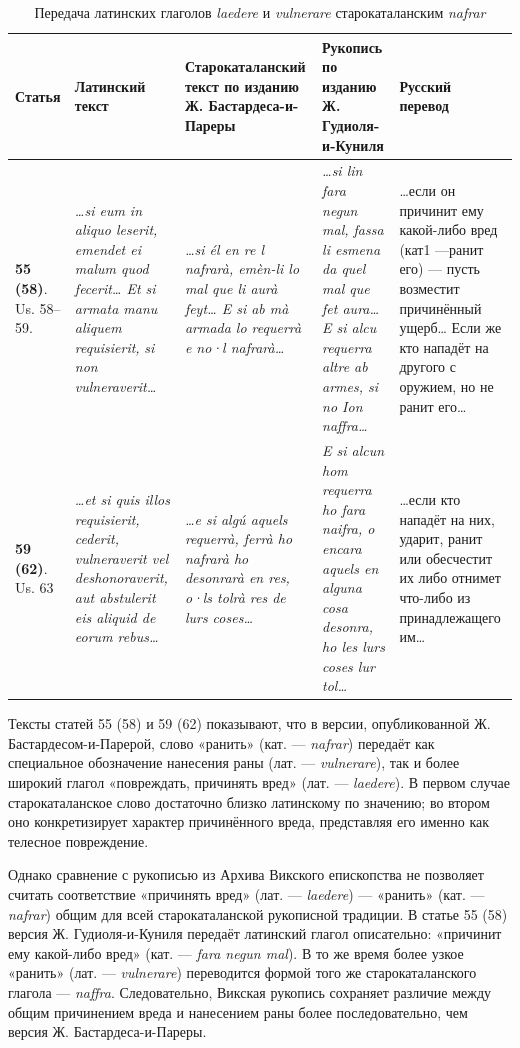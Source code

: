 \begin{center}
\small
\setlength{\tabcolsep}{2pt}
\begin{longtable}{|p{}|p{}|p{}|p{}|p{}|}
\caption{Передача латинских глаголов \emph{laedere} и \emph{vulnerare} старокаталанским \emph{nafrar}}\label{tab:ch2-nafrar}\\
\hline
\textbf{Статья} & \textbf{Латинский текст } & \textbf{Старокаталанский текст по изданию Ж. Бастардеса-и-Пареры} & \textbf{Рукопись по изданию Ж. Гудиоля-и-Куниля} & \textbf{Русский перевод} \\ \hline
\textbf{55 (58)}. Us. 58--59. & \emph{…si eum in aliquo leserit, emendet ei malum quod fecerit… Et si armata manu aliquem requisierit, }\emph{si non vulneraverit…} & \emph{…si él en re l nafrarà, emèn-li lo mal que li aurà feyt… E si ab mà armada lo requerrà e no·l nafrarà…} & \emph{…si lin fara negun mal, fassa li esmena da quel mal que fet aura… E si alcu requerra altre ab }\emph{armes, si no Ion naffra…} & …если он причинит ему какой-либо вред (кат1 ---ранит его) --- пусть возместит причинённый ущерб… Если же кто нападёт на другого с оружием, но не ранит его… \\ \hline
\textbf{59 (62)}. Us. 63 & \emph{…et si quis illos requisierit, cederit, vulneraverit vel deshonoraverit, aut abstulerit eis aliquid de eorum rebus…} & \emph{…e si algú aquels requerrà, ferrà ho nafrarà ho desonrarà en res, o·ls tolrà res de lurs coses…} & \emph{E si alcun hom requerra ho fara naifra, o encara aquels en alguna cosa desonra, ho les lurs coses lur tol…} & …если кто нападёт на них, ударит, ранит или обесчестит их либо отнимет что-либо из принадлежащего им… \\ \hline
\end{longtable}
\end{center}

Тексты статей 55 (58) и 59 (62) показывают, что в версии, опубликованной Ж. Бастардесом-и-Парерой, слово «ранить» (кат. --- \emph{nafrar}) передаёт как специальное обозначение нанесения раны (лат. --- \emph{vulnerare}), так и более широкий глагол «повреждать, причинять вред» (лат. --- \emph{laedere}). В первом случае старокаталанское слово достаточно близко латинскому по значению; во втором оно конкретизирует характер причинённого вреда, представляя его именно как телесное повреждение.

Однако сравнение с рукописью из Архива Викского епископства не позволяет считать соответствие «причинять вред» (лат. --- \emph{laedere}) --- «ранить» (кат. --- \emph{nafrar}) общим для всей старокаталанской рукописной традиции. В статье 55 (58) версия Ж. Гудиоля-и-Куниля передаёт латинский глагол описательно: «причинит ему какой-либо вред» (кат. --- \emph{fara negun mal}). В то же время более узкое «ранить» (лат. --- \emph{vulnerare}) переводится формой того же старокаталанского глагола --- \emph{naffra}. Следовательно, Викская рукопись сохраняет различие между общим причинением вреда и нанесением раны более последовательно, чем версия Ж. Бастардеса-и-Пареры.

